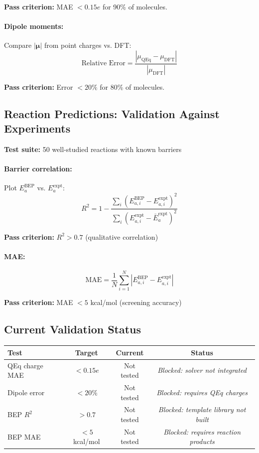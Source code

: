 \documentclass[11pt]{article}
\begin{document}
\textbf{Pass criterion:} MAE $< 0.15e$ for 90\% of molecules.

\paragraph{Dipole moments:}
Compare $|\boldsymbol{\mu}|$ from point charges vs. DFT:
\begin{equation}
\text{Relative Error} = \frac{|\mu_{\text{QEq}} - \mu_{\text{DFT}}|}{|\mu_{\text{DFT}}|}
\end{equation}

\textbf{Pass criterion:} Error $< 20\%$ for 80\% of molecules.

\subsection{Reaction Predictions: Validation Against Experiments}

\textbf{Test suite:} 50 well-studied reactions with known barriers

\paragraph{Barrier correlation:}
Plot $E_a^{\text{BEP}}$ vs. $E_a^{\text{expt}}$:
\begin{equation}
R^2 = 1 - \frac{\sum_i (E_{a,i}^{\text{BEP}} - E_{a,i}^{\text{expt}})^2}{\sum_i (E_{a,i}^{\text{expt}} - \bar{E}_a^{\text{expt}})^2}
\end{equation}

\textbf{Pass criterion:} $R^2 > 0.7$ (qualitative correlation)

\paragraph{MAE:}
\begin{equation}
\text{MAE} = \frac{1}{N}\sum_{i=1}^{N} |E_{a,i}^{\text{BEP}} - E_{a,i}^{\text{expt}}|
\end{equation}

\textbf{Pass criterion:} MAE $< 5$ kcal/mol (screening accuracy)

\subsection{Current Validation Status}

\begin{center}
\begin{tabular}{lccc}
\toprule
Test & Target & Current & Status \\
\midrule
QEq charge MAE & $<0.15e$ & Not tested & \textit{Blocked: solver not integrated} \\
Dipole error & $<20\%$ & Not tested & \textit{Blocked: requires QEq charges} \\
BEP $R^2$ & $>0.7$ & Not tested & \textit{Blocked: template library not built} \\
BEP MAE & $<5$ kcal/mol & Not tested & \textit{Blocked: requires reaction products} \\
\bottomrule
\end{tabular}
\end{center}
\end{document}
